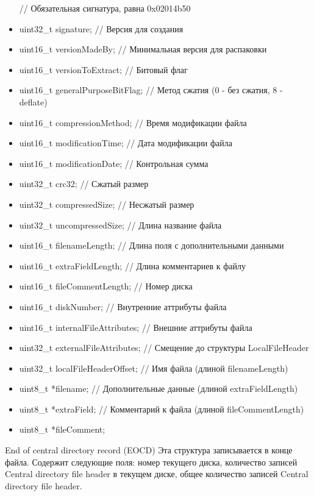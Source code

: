 \begin{itemize}
    // Обязательная сигнатура, равна 0x02014b50 
\item    uint32_t signature;    // Версия для создания
\item    uint16_t versionMadeBy;    // Минимальная версия для распаковки
\item    uint16_t versionToExtract;    // Битовый флаг
\item    uint16_t generalPurposeBitFlag;    // Метод сжатия (0 - без сжатия, 8 - deflate)
\item    uint16_t compressionMethod;    // Время модификации файла
\item    uint16_t modificationTime;    // Дата модификации файла
\item    uint16_t modificationDate;    // Контрольная сумма
\item    uint32_t crc32;    // Сжатый размер
\item    uint32_t compressedSize;    // Несжатый размер
\item    uint32_t uncompressedSize;    // Длина название файла
\item    uint16_t filenameLength;    // Длина поля с дополнительными данными
\item    uint16_t extraFieldLength;    // Длина комментариев к файлу
\item    uint16_t fileCommentLength;    // Номер диска
\item    uint16_t diskNumber;    // Внутренние аттрибуты файла
\item    uint16_t internalFileAttributes;    // Внешние аттрибуты файла
\item    uint32_t externalFileAttributes;    // Смещение до структуры LocalFileHeader
\item    uint32_t localFileHeaderOffset;    // Имя файла (длиной filenameLength)
\item    uint8_t *filename;    // Дополнительные данные (длиной extraFieldLength)
\item    uint8_t *extraField;    // Комментарий к файла (длиной fileCommentLength)
\item   uint8_t *fileComment;
\end{itemize}
End of central directory record (EOCD)
Эта структура записывается в конце файла. Содержит следующие поля: номер текущего диска, количество записей Central directory file header в текущем диске, общее количество записей Central directory file header.

